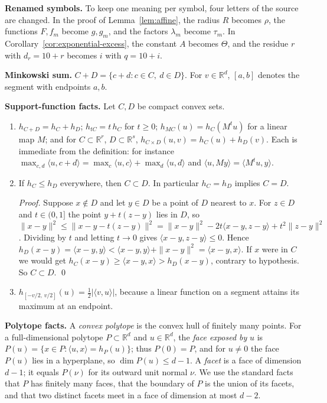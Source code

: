 \documentclass[11pt]{article}
\newcommand{\R}{\mathbb R}
\begin{document}
\textbf{Renamed symbols.} To keep one meaning per symbol, four letters of
the source are changed. In the proof of Lemma~\ref{lem:affine}, the
radius \(R\) becomes \(\rho\), the functions \(F,f_m\) become
\(g,g_m\), and the factors \(\lambda_m\) become \(\tau_m\). In
Corollary~\ref{cor:exponential-excess}, the constant \(A\) becomes
\(\Theta\), and the residue \(r\) with \(d_r=10+r\) becomes \(i\) with
\(q=10+i\).

\textbf{Minkowski sum.} \(C+D=\{c+d:c\in C,\ d\in D\}\). For
\(v\in\R^d\), \([a,b]\) denotes the segment with endpoints \(a,b\).

\textbf{Support-function facts.} Let \(C,D\) be compact convex sets.
\begin{enumerate}[label=(S\arabic*),leftmargin=3em]
\item \(h_{C+D}=h_C+h_D\); \(h_{tC}=t\,h_C\) for \(t\ge0\);
 \(h_{MC}(u)=h_C(M^{t}u)\) for a linear map \(M\); and for
 \(C\subset\R^r\), \(D\subset\R^s\),
 \(h_{C\times D}(u,v)=h_C(u)+h_D(v)\). Each is immediate from the
 definition: for instance
 \(\max_{c,d}\langle u,c+d\rangle=\max_c\langle u,c\rangle+\max_d\langle u,d\rangle\)
 and \(\langle u,My\rangle=\langle M^tu,y\rangle\).
\item If \(h_C\le h_D\) everywhere, then \(C\subset D\). In particular
 \(h_C=h_D\) implies \(C=D\).

 \emph{Proof.} Suppose \(x\notin D\) and let \(y\in D\) be a point of
 \(D\) nearest to \(x\). For \(z\in D\) and \(t\in(0,1]\) the point
 \(y+t(z-y)\) lies in \(D\), so
 \(\|x-y\|^2\le\|x-y-t(z-y)\|^2
 =\|x-y\|^2-2t\langle x-y,z-y\rangle+t^2\|z-y\|^2\). Dividing by \(t\)
 and letting \(t\to0\) gives \(\langle x-y,z-y\rangle\le0\). Hence
 \(h_D(x-y)=\langle x-y,y\rangle
 <\langle x-y,y\rangle+\|x-y\|^2=\langle x-y,x\rangle\). If \(x\) were
 in \(C\) we would get \(h_C(x-y)\ge\langle x-y,x\rangle>h_D(x-y)\),
 contrary to hypothesis. So \(C\subset D\). \qed
\item \(h_{[-v/2,\,v/2]}(u)=\tfrac12|\langle v,u\rangle|\), because a
 linear function on a segment attains its maximum at an endpoint.
\end{enumerate}

\textbf{Polytope facts.} A \emph{convex polytope} is the convex hull of
finitely many points. For a full-dimensional polytope \(P\subset\R^d\)
and \(u\in\R^d\), the \emph{face exposed by} \(u\) is
\(P(u)=\{x\in P:\langle u,x\rangle=h_P(u)\}\); thus \(P(0)=P\), and
for \(u\ne0\) the face \(P(u)\) lies in a hyperplane, so
\(\dim P(u)\le d-1\). A \emph{facet} is a face of dimension \(d-1\); it
equals \(P(\nu)\) for its outward unit normal \(\nu\). We use the
standard facts that \(P\) has finitely many faces, that the boundary of
\(P\) is the union of its facets, and that two distinct facets meet in
a face of dimension at most \(d-2\).
\end{document}
